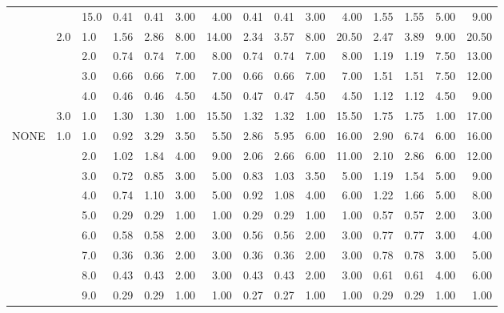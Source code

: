 \begin{tabular}{lllrrrrrrrrrrrr}
     &     & 15.0 &       0.41 &      0.41 & 3.00 &   4.00 &       0.41 &      0.41 & 3.00 &   4.00 &       1.55 &      1.55 & 5.00 &   9.00 \\
     & 2.0 & 1.0  &       1.56 &      2.86 & 8.00 &  14.00 &       2.34 &      3.57 & 8.00 &  20.50 &       2.47 &      3.89 & 9.00 &  20.50 \\
     &     & 2.0  &       0.74 &      0.74 & 7.00 &   8.00 &       0.74 &      0.74 & 7.00 &   8.00 &       1.19 &      1.19 & 7.50 &  13.00 \\
     &     & 3.0  &       0.66 &      0.66 & 7.00 &   7.00 &       0.66 &      0.66 & 7.00 &   7.00 &       1.51 &      1.51 & 7.50 &  12.00 \\
     &     & 4.0  &       0.46 &      0.46 & 4.50 &   4.50 &       0.47 &      0.47 & 4.50 &   4.50 &       1.12 &      1.12 & 4.50 &   9.00 \\
     & 3.0 & 1.0  &       1.30 &      1.30 & 1.00 &  15.50 &       1.32 &      1.32 & 1.00 &  15.50 &       1.75 &      1.75 & 1.00 &  17.00 \\
NONE & 1.0 & 1.0  &       0.92 &      3.29 & 3.50 &   5.50 &       2.86 &      5.95 & 6.00 &  16.00 &       2.90 &      6.74 & 6.00 &  16.00 \\
     &     & 2.0  &       1.02 &      1.84 & 4.00 &   9.00 &       2.06 &      2.66 & 6.00 &  11.00 &       2.10 &      2.86 & 6.00 &  12.00 \\
     &     & 3.0  &       0.72 &      0.85 & 3.00 &   5.00 &       0.83 &      1.03 & 3.50 &   5.00 &       1.19 &      1.54 & 5.00 &   9.00 \\
     &     & 4.0  &       0.74 &      1.10 & 3.00 &   5.00 &       0.92 &      1.08 & 4.00 &   6.00 &       1.22 &      1.66 & 5.00 &   8.00 \\
     &     & 5.0  &       0.29 &      0.29 & 1.00 &   1.00 &       0.29 &      0.29 & 1.00 &   1.00 &       0.57 &      0.57 & 2.00 &   3.00 \\
     &     & 6.0  &       0.58 &      0.58 & 2.00 &   3.00 &       0.56 &      0.56 & 2.00 &   3.00 &       0.77 &      0.77 & 3.00 &   4.00 \\
     &     & 7.0  &       0.36 &      0.36 & 2.00 &   3.00 &       0.36 &      0.36 & 2.00 &   3.00 &       0.78 &      0.78 & 3.00 &   5.00 \\
     &     & 8.0  &       0.43 &      0.43 & 2.00 &   3.00 &       0.43 &      0.43 & 2.00 &   3.00 &       0.61 &      0.61 & 4.00 &   6.00 \\
     &     & 9.0  &       0.29 &      0.29 & 1.00 &   1.00 &       0.27 &      0.27 & 1.00 &   1.00 &       0.29 &      0.29 & 1.00 &   1.00 \\

\end{tabular}
